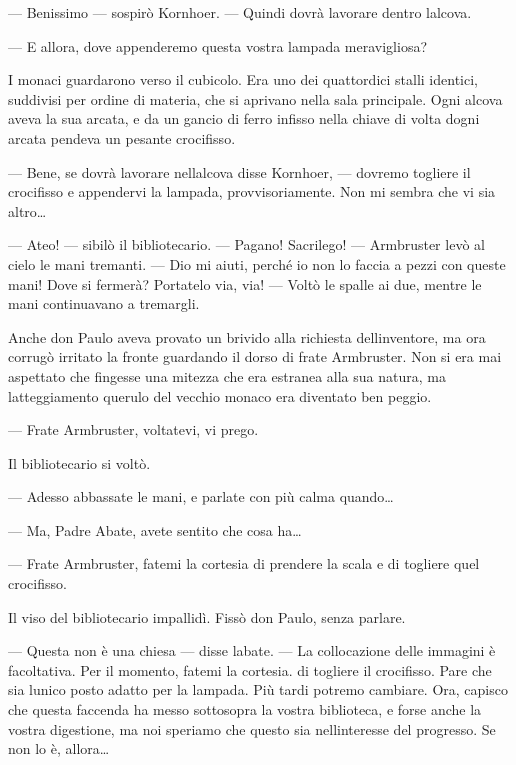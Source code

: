 --- Benissimo --- sospirò Kornhoer. --- Quindi dovrà lavorare dentro
l\textquotesingle alcova.

--- E allora, dove appenderemo questa vostra lampada meravigliosa?

I monaci guardarono verso il cubicolo. Era uno dei quattordici stalli
identici, suddivisi per ordine di materia, che si aprivano nella sala
principale. Ogni alcova aveva la sua arcata, e da un gancio di ferro
infisso nella chiave di volta d\textquotesingle ogni arcata pendeva un
pesante crocifisso.

--- Bene, se dovrà lavorare nell\textquotesingle alcova disse Kornhoer,
--- dovremo togliere il crocifisso e appendervi la lampada,
provvisoriamente. Non mi sembra che vi sia altro\ldots{}

--- Ateo! --- sibilò il bibliotecario. --- Pagano! Sacrilego! ---
Armbruster levò al cielo le mani tremanti. --- Dio mi aiuti, perché io
non lo faccia a pezzi con queste mani! Dove si fermerà? Portatelo via,
via! --- Voltò le spalle ai due, mentre le mani continuavano a
tremargli.

Anche don Paulo aveva provato un brivido alla richiesta
dell\textquotesingle inventore, ma ora corrugò irritato la fronte
guardando il dorso di frate Armbruster. Non si era mai aspettato che
fingesse una mitezza che era estranea alla sua natura, ma
l\textquotesingle atteggiamento querulo del vecchio monaco era diventato
ben peggio.

--- Frate Armbruster, voltatevi, vi prego.

Il bibliotecario si voltò.

--- Adesso abbassate le mani, e parlate con più calma quando\ldots{}

--- Ma, Padre Abate, avete sentito che cosa ha\ldots{}

--- Frate Armbruster, fatemi la cortesia di prendere la scala e di
togliere quel crocifisso.

Il viso del bibliotecario impallidì. Fissò don Paulo, senza parlare.

--- Questa non è una chiesa --- disse l\textquotesingle abate. --- La
collocazione delle immagini è facoltativa. Per il momento, fatemi la
cortesia. di togliere il crocifisso. Pare che sia
l\textquotesingle unico posto adatto per la lampada. Più tardi potremo
cambiare. Ora, capisco che questa faccenda ha messo sottosopra la vostra
biblioteca, e forse anche la vostra digestione, ma noi speriamo che
questo sia nell\textquotesingle interesse del progresso. Se non lo è,
allora\ldots{}

